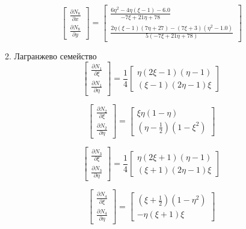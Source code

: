\documentclass[a4paper, 12pt]{article}
\begin{document}
\begin{enumerate}
\begin{enumerate}
			\[
				\begin{bmatrix}
				\frac{\partial N_8}{\partial x} \\ 
				\frac{\partial N_8}{\partial y}
				\end{bmatrix}
				=
				\left[\begin{matrix}\frac{6\eta^{2} - 4\eta \left(\xi - 1\right) - 6.0}{- 7\xi + 21\eta + 78}\\\frac{2\eta \left(\xi - 1\right) \left(7\eta + 27\right) - \left(7\xi + 3\right) \left(\eta^{2} - 1.0\right)}{5 \left(- 7\xi + 21\eta + 78\right)}\end{matrix}\right]
			\]
			\item Лагранжево семейство
			\[
				\begin{bmatrix}
				\frac{\partial N_1}{\partial \xi} \\ 
				\frac{\partial N_1}{\partial \eta}
				\end{bmatrix}
				=
				\frac{1}{4}
				\begin{bmatrix}
				\eta (2\xi - 1)(\eta - 1) \\ 
				(\xi - 1)(2\eta - 1)\xi
				\end{bmatrix}
			\]

			\[
				\begin{bmatrix}
				\frac{\partial N_2}{\partial \xi} \\ 
				\frac{\partial N_2}{\partial \eta}
				\end{bmatrix}
				=
				\begin{bmatrix}
				\xi \eta (1 - \eta) \\ 
				\left(\eta - \frac{1}{2}\right)(1 - \xi^2)
				\end{bmatrix}
			\]

			\[
				\begin{bmatrix}
				\frac{\partial N_3}{\partial \xi} \\ 
				\frac{\partial N_3}{\partial \eta}
				\end{bmatrix}
				=
				\frac{1}{4}
				\begin{bmatrix}
				\eta (2\xi + 1)(\eta - 1) \\ 
				(\xi + 1)(2\eta - 1)\xi
				\end{bmatrix}
			\]

			\[
				\begin{bmatrix}
				\frac{\partial N_4}{\partial \xi} \\ 
				\frac{\partial N_4}{\partial \eta}
				\end{bmatrix}
				=
				\begin{bmatrix}
				\left(\xi + \frac{1}{2}\right)(1 - \eta^2) \\ 
				-\eta(\xi + 1)\xi
				\end{bmatrix}
			\]


\end{enumerate}
\end{enumerate}
\end{document}
